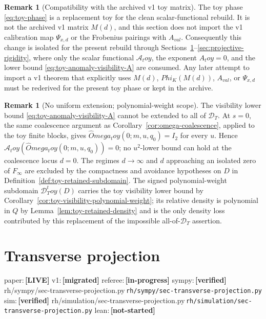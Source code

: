 \documentclass[11pt,a4paper]{amsart}
\def\Omega{Omega}%
\def\Phi{Phi}%
\def\toy{toy}%
\def\val{val}%
\numberwithin{equation}{section}
\theoremstyle{plain}
\theoremstyle{definition}
\newtheorem{remark}[theorem]{Remark}
\newcommand{\Om}{\Omega}
\newcommand{\toy}{\mathrm{toy}}
\newcommand{\val}{\mathrm{val}}
\newcommand{\status}[1]{\textbf{\scriptsize[#1]}}
\newcommand{\statuspaper}[1]{\textsf{\footnotesize paper:}\,\status{#1}}
\newcommand{\statusmig}[1]{\textsf{\footnotesize v1:}\,\status{#1}}
\newcommand{\statusreferee}[1]{\textsf{\footnotesize referee:}\,\status{#1}}
\newcommand{\statussympy}[2][\relax]{%
  \textsf{\footnotesize sympy:}\,\status{#2}%
  \ifx\relax#1\else\,\textsf{\scriptsize\texttt{#1}}\fi%
}
\newcommand{\statussim}[2][\relax]{%
  \textsf{\footnotesize sim:}\,\status{#2}%
  \ifx\relax#1\else\,\textsf{\scriptsize\texttt{#1}}\fi%
}
\newcommand{\statuslean}[2][\relax]{%
  \textsf{\footnotesize lean:}\,\status{#2}%
  \ifx\relax#1\else\,\textsf{\scriptsize\texttt{#1}}\fi%
}
\begin{document}
\begin{remark}[Compatibility with the archived v1 toy matrix]
\label{rem:toy-phase-v1-compatibility}
The toy phase \eqref{eq:toy-phase} is a replacement toy for the clean
scalar-functional rebuild.  It is not the archived v1 matrix \(M(d)\),
and this section does not import the v1 calibration map
\(\Psi_{x,d}\) or the Frobenius pairings with \(A_{\val}\).  Consequently
this change is isolated for the present rebuild through
Sections~\ref{sec:transverse-projection}--\ref{sec:projective-rigidity},
where only the scalar functional \(\mathcal A_\toy\), the exponent
\(A_\toy=0\), and the lower bound \eqref{eq:toy-anomaly-visibility-A}
are consumed.  Any later attempt to import a v1 theorem that explicitly
uses \(M(d)\), \(\Phi_K(M(d))\), \(A_{\val}\), or \(\Psi_{x,d}\) must be
rederived for the present toy phase or kept in the archive.
\end{remark}

\begin{remark}[No uniform extension; polynomial-weight scope]
\label{rem:toy-anomaly-no-uniform-extension}
The visibility lower bound \eqref{eq:toy-anomaly-visibility-A} cannot be
extended to all of \(\mathcal D_T\).  At \(s=0\), the same coalescence
argument as Corollary~\ref{cor:omega-coalescence}, applied to the toy
finite blocks, gives \(\widehat\Om_\toy(0;m,u,q_0)=I_2\) for every \(u\).
Hence \(\mathcal A_\toy(\widehat\Om_\toy(0;m,u,q_0))=0\); no
\(u^2\)-lower bound can hold at the coalescence locus \(d=0\).  The
regimes \(d\to\infty\) and \(d\) approaching an isolated zero of
\(F_\infty\) are excluded by the compactness and avoidance hypotheses on
\(D\) in Definition~\ref{def:toy-retained-subdomain}.  The signed
polynomial-weight subdomain \(\mathcal D_T^\toy(D)\) carries the toy
visibility lower bound by
Corollary~\ref{cor:toy-visibility-polynomial-weight}; its relative
density is polynomial in \(Q\) by Lemma~\ref{lem:toy-retained-density}
and is the only density loss contributed by this replacement of the
impossible all-of-\(\mathcal D_T\) assertion.
\end{remark}

\section{Transverse projection}
\label{sec:transverse-projection}
\statuspaper{LIVE}\quad
\statusmig{migrated}\quad
\statusreferee{in-progress}\quad
\statussympy[rh/sympy/sec-transverse-projection.py]{verified}\quad
\statussim[rh/simulation/sec-transverse-projection.py]{verified}\quad
\statuslean{not-started}
\par\medskip
\end{document}
